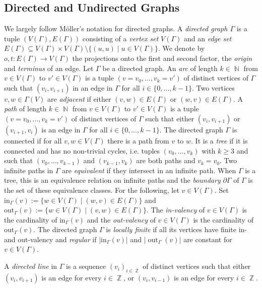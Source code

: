 \documentclass{article}
\DeclareMathOperator\out{out}
\DeclareMathOperator\bbN{\mathbb{N}}
\DeclareMathOperator\bbZ{\mathbb{Z}}
\theoremstyle{definition}
\begin{document}
\subsection{Directed and Undirected Graphs}

We largely follow M{\"o}ller's notation for directed graphs. A \emph{directed graph $\Gamma$} is a tuple $(V(\Gamma),E(\Gamma))$ consisting of a \emph{vertex set} $V(\Gamma)$ and an \emph{edge set} $E(\Gamma)\subseteq V(\Gamma)\times V(\Gamma)\setminus\{(u,u)\mid u\in V(\Gamma)\}$. We denote by $o,t:E(\Gamma)\to V(\Gamma)$ the projections onto the first and second factor, the \emph{origin} and \emph{terminus} of an edge.
Let $\Gamma$ be a directed graph. An \emph{arc} of length $k\in \bbN$ from $v\in V(\Gamma)$ to $v'\in V(\Gamma)$ is a tuple $(v=v_{0},\ldots,v_{k}=v')$ of distinct vertices of $\Gamma$ such that $(v_{i},v_{i+1})$ in an edge in $\Gamma$ for all $i\!\in\!\{0,\ldots,k-1\}$. Two vertices $v,w\in\Gamma(V)$ are \emph{adjacent} if either $(v,w)\in E(\Gamma)$ or $(w,v)\in E(\Gamma)$. A \emph{path}  of length $k\in \bbN$ from $v\in V(\Gamma)$ to $v'\in V(\Gamma)$ is a tuple $(v=v_{0},\ldots,v_{k}=v')$ of distinct vertices of $\Gamma$ such that either $(v_{i},v_{i+1})$ or $(v_{i+1},v_{i})$ is an edge in $\Gamma$ for all $i\in\{0,\ldots,k-1\}$. The directed graph $\Gamma$ is connected if for all $v,w\in V(\Gamma)$ there is a path from $v$ to $w$. It is a \emph{tree} if it is connected and has no non-trivial cycles, i.e. tuples $(v_{0},\ldots,v_{k})$ with $k\ge 3$ and such that $(v_{0},\ldots,v_{k-1})$ and $(v_{k-1},v_k)$ are both paths and $v_{k}=v_{0}$. Two infinite paths in $\Gamma$ are \emph{equivalent} if they intersect in an infinite path. When $\Gamma$ is a tree, this is an equivalence relation on infinite paths and the \emph{boundary} $\partial\Gamma$ of $\Gamma$ is the set of these equivalence classes. For the following, let $v\!\in\! V(\Gamma)$. Set $\mathrm{in}_{\Gamma}(v)\!:=\!\{w\in V(\Gamma)\mid (w,v)\in E(\Gamma)\}$ and $\mathrm{out}_{\Gamma}(v):=\{w\in V(\Gamma)\mid (v,w)\in E(\Gamma)\}$. The \emph{in-valency} of $v\in V(\Gamma)$ is the cardinality of $\mathrm{in}_{\Gamma}(v)$ and the \emph{out-valency} of $v\in V(\Gamma)$ is the cardinality of $\mathrm{out}_{\Gamma}(v)$. The directed graph $\Gamma$ is \emph{locally finite} if all its vertices have finite in- and out-valency and \emph{regular} if $|\mathrm{in}_{\Gamma}(v)|$ and $|\out_{\Gamma}(v)|$ are constant for $v\in V(\Gamma)$.

A \emph{directed line} in $\Gamma$ is a sequence $(v_{i})_{i\in\bbZ}$ of distinct vertices such that either $(v_{i},v_{i+1})$ is an edge for every $i\in\bbZ$, or $(v_{i},v_{i-1})$ is an edge for every $i\in\bbZ$.
\end{document}

